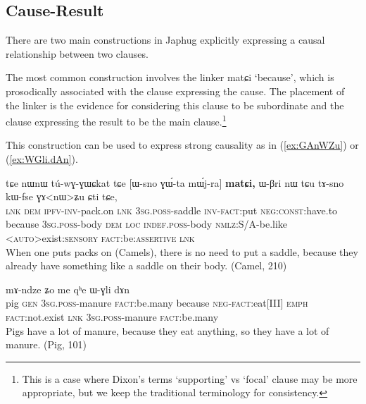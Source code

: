 \documentclass[oldfontcommands,oneside,a4paper,11pt]{article}
\newcommand{\ipa}[1]{{\phon \mbox{#1}}} %
\newcommand{\refb}[1]{(\ref{#1})}
\begin{document}
\subsection{Cause-Result} \label{sec:cause}
There are two main constructions in Japhug explicitly expressing a causal relationship between two clauses. 

The most common construction involves the linker \ipa{matɕi} `because', which is prosodically associated with the  clause expressing the cause.  The placement of the linker is the evidence for considering this clause to be subordinate and the clause expressing the result to be the main clause.\footnote{This is a case where Dixon's terms `supporting' vs `focal' clause may be more appropriate, but we keep the traditional terminology for consistency.}

This construction can be used to express strong causality as in \refb{ex:GAnWZu} or \refb{ex:WGli.dAn}.
\begin{exe}
\ex \label{ex:GAnWZu}
\gll 
\ipa{tɕe}   	\ipa{nɯnɯ}   	\ipa{tú-wɣ-ɣɯɕkat}   	\ipa{tɕe}   	[\ipa{ɯ-sno}   	\ipa{ɣɯ́-ta}   	\ipa{mɯ́j-ra}]   	\textbf{\ipa{matɕi,}}   	\ipa{ɯ-βri}   	\ipa{nɯ} \ipa{tɕu}   	\ipa{tɤ-sno}   	\ipa{kɯ-fse}   	\ipa{ɣɤ<nɯ>ʑu}   	\ipa{ɕti}   	\ipa{tɕe,}   \\
\textsc{lnk} \textsc{dem} \textsc{ipfv-inv}-pack.on \textsc{lnk} \textsc{3sg.poss}-saddle \textsc{inv-fact}:put \textsc{neg:const}:have.to because   \textsc{3sg.poss}-body \textsc{dem} \textsc{loc} \textsc{indef.poss}-body \textsc{nmlz}:S/A-be.like <\textsc{auto}>exist:\textsc{sensory} \textsc{fact:}be:\textsc{assertive} \textsc{lnk} \\
\glt When one puts packs on (Camels), there is no need to put a saddle, because they already have something like a saddle on their body. (Camel, 210)
 \end{exe}
 
\begin{exe}
\ex \label{ex:WGli.dAn}
\gll [\ipa{paʁ}   	\ipa{ɣɯ}   	\ipa{ɯ-ɣli}   	\ipa{dɤn}]   	\ipa{\textbf{matɕi},}   	\ipa{mɤ-ndze}   	\ipa{ʑo}   	\ipa{me}   	\ipa{qʰe}   	\ipa{ɯ-ɣli}   	\ipa{dɤn}   \\
pig \textsc{gen} \textsc{3sg.poss}-manure \textsc{fact}:be.many because \textsc{neg-fact}:eat[III] \textsc{emph} \textsc{fact}:not.exist \textsc{lnk} \textsc{3sg.poss}-manure  \textsc{fact}:be.many \\
\glt Pigs have a lot of manure, because they eat anything, so they have a lot of manure. (Pig, 101)
\end{exe}
\end{document}

